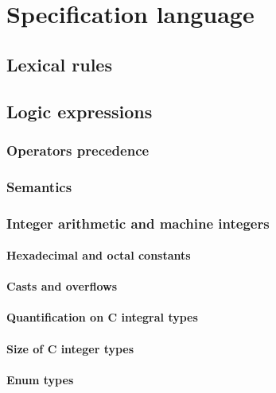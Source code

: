 
\chapter{Specification language}
\label{chap:base}

\section{Lexical rules}

\section{Logic expressions}
\label{sec:expressions}

\subsection{Operators precedence}

\subsection{Semantics}
\label{sec:twovaluedlogic}

\subsection{Integer arithmetic and machine integers}

\subsubsection{Hexadecimal and octal constants}

\subsubsection{Casts and  overflows}

\subsubsection{Quantification on C integral types}
\label{sec:quantification}

\subsubsection{Size of C integer types}

\subsubsection{Enum types}


